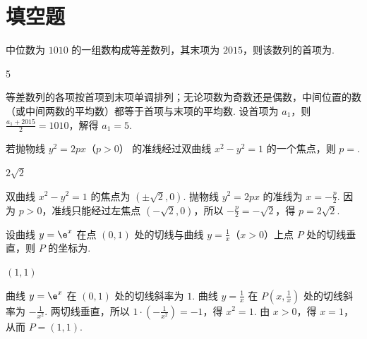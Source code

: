 \section{填空题}

\begin{problem}
中位数为 \(1010\) 的一组数构成等差数列，其末项为 \(2015\)，则该数列的首项为\fillinblank{}.
\end{problem}

\begin{answer}
5
\end{answer}

\begin{solution}
等差数列的各项按首项到末项单调排列；无论项数为奇数还是偶数，中间位置的数（或中间两数的平均数）都等于首项与末项的平均数. 设首项为 \(a_1\)，则
\(\frac{a_1+2015}{2}=1010\)，解得 \(a_1=5\).
\end{solution}

\begin{problem}
若抛物线 \( y^{2} = 2px \)（\(p > 0\)） 的准线经过双曲线 \( x^{2} - y^{2} = 1 \) 的一个焦点，则 \( p = \)\fillinblank{}.
\end{problem}

\begin{answer}
\(2\sqrt{2}\)
\end{answer}

\begin{solution}
双曲线 \(x^{2}-y^{2}=1\) 的焦点为 \((\pm\sqrt{2},0)\). 抛物线 \(y^{2}=2px\) 的准线为 \(x=-\frac{p}{2}\). 因为 \(p>0\)，准线只能经过左焦点 \((-\sqrt{2},0)\)，所以
\(-\frac{p}{2}=-\sqrt{2}\)，得 \(p=2\sqrt{2}\).
\end{solution}

\begin{problem}
设曲线 \(y = \e^{x}\) 在点 \((0,1)\) 处的切线与曲线 \(y = \frac{1}{x}\)（\(x > 0\)）上点 \(P\) 处的切线垂直，则 \(P\) 的坐标为\fillinblank{}.
\end{problem}

\begin{answer}
\((1,1)\)
\end{answer}

\begin{solution}
曲线 \(y=\e^{x}\) 在 \((0,1)\) 处的切线斜率为 \(1\). 曲线 \(y=\frac{1}{x}\) 在 \(P(x,\frac{1}{x})\) 处的切线斜率为 \(-\frac{1}{x^{2}}\). 两切线垂直，所以
\(1\cdot\left(-\frac{1}{x^{2}}\right)=-1\)，得 \(x^{2}=1\). 由 \(x>0\)，得 \(x=1\)，从而 \(P=(1,1)\).
\end{solution}

